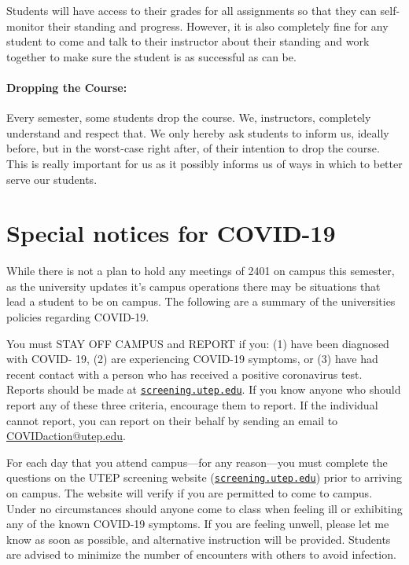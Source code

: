 \documentclass[12pt]{scrartcl}
\begin{document}
Students will have access to their grades for all assignments so that they can self-monitor their standing and progress. 
However, it is also completely fine for any student to come and talk to their instructor about their standing and work together to make sure the student is as successful as can be.

\paragraph{Dropping the Course:} 
Every semester, some students drop the course. We, instructors, completely understand and respect that. We only hereby ask students to inform us, ideally before, but in the worst-case right after, of their intention to drop the course. This is really important for us as it possibly informs us of ways in which to better serve our students.


\section{Special notices for COVID-19}

While there is not a plan to hold any meetings of 2401 on campus this semester, 
as the university updates it's campus operations there may be situations that lead a student to be on campus. 
The following are a summary of the universities policies regarding COVID-19.

You must STAY OFF CAMPUS and REPORT if you:
(1) have been diagnosed with COVID- 19, 
(2) are experiencing COVID-19 symptoms, or 
(3) have had recent contact with a person who has received a positive coronavirus test. 
Reports should be made at \href{http://screening.utep.edu}{\texttt{screening.utep.edu}}. 
If you know anyone who should report any of these three criteria, encourage them to report. 
If the individual cannot report, you can report on their behalf by sending an email to \url{COVIDaction@utep.edu}.

For each day that you attend campus—for any reason—you must complete the questions on the UTEP screening website (\href{http://screening.utep.edu}{\texttt{screening.utep.edu}}) prior to arriving on campus. 
The website will verify if you are permitted to come to campus. 
Under no circumstances should anyone come to class when feeling ill or exhibiting any of the known COVID-19 symptoms. 
If you are feeling unwell, please let me know as soon as possible, 
and alternative instruction will be provided. Students are advised to minimize the number of encounters with others to avoid infection.
\end{document}
